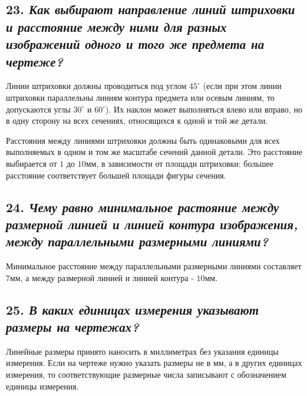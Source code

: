
\subsection*{23. \textit{Как выбирают направление линий штриховки и расстояние между ними для разных изображений одного и того же предмета на чертеже?}}

Линии штриховки должны проводиться под углом $45^{\circ}$ (если при этом линии штриховки параллельны линиям контура предмета или осевым линиям, то допускаются углы $30^{\circ}$ и $60^{\circ}$). Их наклон может выполняться влево или вправо, но в одну сторону на всех сечениях, относящихся к одной и той же детали.

Расстояния между линиями штриховки должны быть одинаковыми для всех выполняемых в одном и том же масштабе сечений данной детали. Это расстояние выбирается от $1$ до $10 \text{мм}$, в зависимости от площади штриховки: большее расстояние соответствует большей площади фигуры сечения.
\subsection*{24. \textit{Чему равно минимальное растояние между размерной линией и линией контура изображения, между параллельными размерными линиями?}}

Минимальное расстояние между параллельными размерными линиями составляет $7$мм, а между размерной линией и линией контура - $10$мм.
\subsection*{25. \textit{В каких единицах измерения указывают размеры на чертежах?}}

Линейные размеры принято наносить в миллиметрах без указания единицы измерения. Если на чертеже нужно указать размеры не в мм, а в других единицах измерения, то соответствующие размерные числа записывают с обозначением единицы измерения.

    